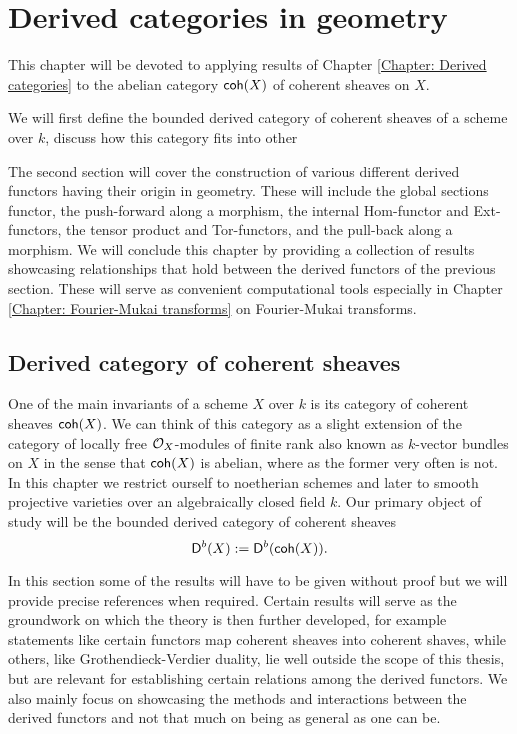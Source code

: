 \section{Derived categories in geometry}
\label{Chapter: Derived categories in geometry}

This chapter will be devoted to applying results of Chapter \ref{Chapter: Derived categories} to the abelian category $\mathsf{coh}(X)$ of coherent sheaves on $X$. 

We will first define the bounded derived category of coherent sheaves of a scheme over $k$, discuss how this category fits into other 

The second section will cover the construction of various different derived functors having their origin in geometry. These will include the global sections functor, the push-forward along a morphism, the internal Hom-functor and Ext-functors, the tensor product and Tor-functors, and the pull-back along a morphism. 
We will conclude this chapter by providing a collection of results showcasing relationships that hold between the derived functors of the previous section. These will serve as convenient computational tools especially in Chapter \ref{Chapter: Fourier-Mukai transforms} on Fourier-Mukai transforms.

\subsection{Derived category of coherent sheaves}
\label{Subsection: Derived category of coherent sheaves}

One of the main invariants of a scheme $X$ over $k$ is its category of coherent sheaves $\mathsf{coh}(X)$. We can think of this category as a slight extension of the category of locally free $\mathcal O_X$-modules of finite rank also known as $k$-vector bundles on $X$ in the sense that $\mathsf{coh}(X)$ is abelian, where as the former very often is not. In this chapter we restrict ourself to noetherian schemes and later to smooth projective varieties over an algebraically closed field $k$. Our primary object of study will be the bounded derived category of coherent sheaves
\[
    \mathsf{D}^b(X) := \mathsf{D}^b(\mathsf{coh}(X)).
\]

In this section some of the results will have to be given without proof
but we will provide precise references when required. Certain results will serve as the groundwork on which the theory is then further developed, for example statements like certain functors map coherent sheaves into coherent shaves, while others, like Grothendieck-Verdier duality, lie well outside the scope of this thesis, but are relevant for establishing certain relations among the derived functors. We also mainly focus on showcasing the methods and interactions between the derived functors and not that much on being as general as one can be. 

